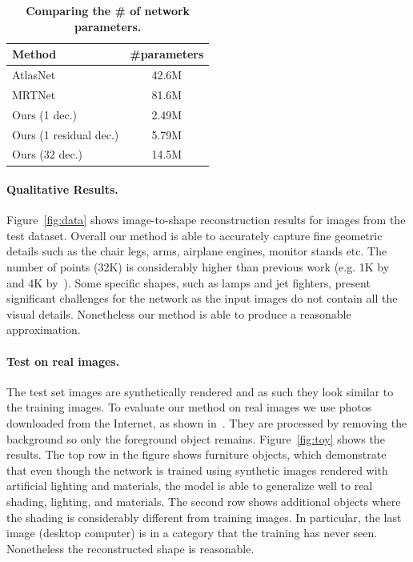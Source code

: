 \begin{table}
\centering
{
\begin{tabular}{|l|c|}
    \hline
    Method &  \#parameters \\
    \hline
    AtlasNet & 42.6M \\
    MRTNet & 81.6M \\
    \hline 
    Ours (1 dec.) & 2.49M \\
    Ours (1 residual dec.) & 5.79M \\
    Ours (32 dec.) & 14.5M  \\
    \hline
\end{tabular}
}
\caption{\label{tab:param} \small
    \textbf{Comparing the \# of network parameters.}
}
\end{table}

\paragraph*{Qualitative Results.} Figure~\ref{fig:data} shows image-to-shape reconstruction results for images from the test dataset. Overall our method is able to accurately capture fine geometric details such as the chair legs, arms, airplane engines, monitor stands etc. The number of points (32K) is considerably higher than previous work (e.g. 1K by~\cite{fan2016point} and 4K by~\cite{mrt18}). Some specific shapes, such as lamps and jet fighters, present significant challenges for the network as the input images do not contain all the visual details. Nonetheless our method is able to produce a reasonable approximation.


\paragraph*{Test on real images.} The test set images are synthetically rendered and as such they look similar to the training images. To evaluate our method on real images we use photos downloaded from the Internet, as shown in~\cite{mrt18}. They are processed by removing the background so only the foreground object remains. Figure~\ref{fig:toy} shows the results. The top row in the figure shows furniture objects, which demonstrate that even though the network is trained using synthetic images rendered with artificial lighting and materials, the model is able to generalize well to real shading, lighting, and materials. The second row shows additional objects where the shading is considerably different from training images. In particular, the last image (desktop computer) is in a category that the training has never seen. Nonetheless the reconstructed shape is reasonable.



